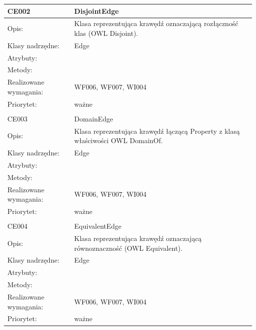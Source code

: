 \documentclass[a4paper,10pt]{article}
\begin{document}
\begin{center}
\begin{longtable}{|m{3cm}|m{9cm}|}
CE002 & DisjointEdge \\ \hline
Opis: & Klasa reprezentująca krawędź oznaczającą rozłączność klas (OWL Disjoint). \\ \hline
Klasy nadrzędne: & Edge    \\ \hline
Atrybuty: & %
 \\ \hline
Metody: & %
  \\ \hline
Realizowane wymagania: & WF006, WF007, WI004 \\ \hline
Priorytet: & ważne  \\ \hline

\multicolumn{2}{c}{} \\
 \hline

CE003 & DomainEdge  \\ \hline
Opis: & Klasa reprezentująca krawędź łączącą Property z klasą właściwości OWL DomainOf.   \\ \hline
Klasy nadrzędne: & Edge \\ \hline
Atrybuty: & %
 \\ \hline
Metody: & %
  \\ \hline
Realizowane wymagania: & WF006, WF007, WI004 \\ \hline
Priorytet: & ważne  \\ \hline

\multicolumn{2}{c}{} \\
 \hline

CE004 & EquivalentEdge \\ \hline
Opis: & Klasa reprezentująca krawędź oznaczającą równoznaczność (OWL Equivalent).    \\ \hline
Klasy nadrzędne: & Edge    \\ \hline
Atrybuty: & %
 \\ \hline
Metody: & %
  \\ \hline
Realizowane wymagania: & WF006, WF007, WI004 \\ \hline
Priorytet: & ważne  \\ \hline


\end{longtable}
\end{center}
\end{document}
